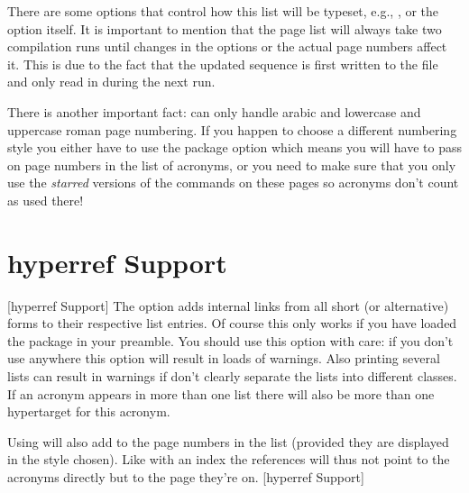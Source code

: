 \documentclass[DIV10,toc=index,toc=bib,hyperfootnotes=false]{cnpkgdoc}
\begin{document}
There are some options that control how this list will be typeset, e.g.,
,  or the option  itself. It is
important to mention that the page list will always take two compilation runs
until changes in the options or the actual page numbers affect it. This is due to
the fact that the updated sequence is first written to the  file and
only read in during the next run.

There is another important fact: \acro can only handle arabic and lowercase and
uppercase roman page numbering. If you happen to choose a different numbering
style you either have to use the package option  which
means you will have to pass on page numbers in the list of acronyms, or you need
to make sure that you only use the \emph{starred} versions of the  commands
on these pages so acronyms don't count as used there!


\section{hyperref Support}[hyperref Support]
The option  adds internal links from all short (or alternative)
forms to their respective list entries. Of course this only works if you have
loaded the  package in your preamble. You should use this option
with care: if you don't use  anywhere this option will result
in loads of  warnings. Also printing several lists can result in
warnings if don't clearly separate the lists into different classes. If an acronym
appears in more than one list there will also be more than one hypertarget for this
acronym.

Using  will also add  to the page numbers in the
list (provided they are displayed in the style chosen). Like with an index the
references will thus not point to the acronyms directly but to the page they're
on.
[hyperref Support]

\appendix
\end{document}
